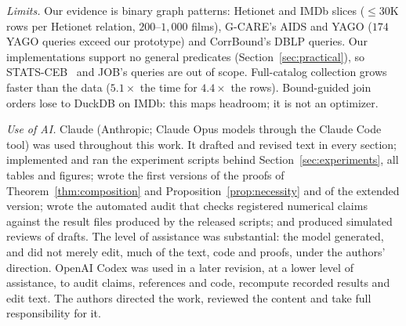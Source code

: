 \documentclass[sigconf, nonacm, acmthm=false]{acmart}
\begin{document}
\emph{Limits.} Our evidence is binary graph patterns: Hetionet and IMDb
slices (${\le}30$K rows per Hetionet relation, $200$--$1{,}000$ films), G-CARE's AIDS and YAGO
($174$ YAGO queries exceed our prototype) and
CorrBound's DBLP queries. Our implementations support no general predicates (Section~\ref{sec:practical}), so
STATS-CEB~\cite{han2021stats} and JOB's queries are out of scope.
Full-catalog collection grows faster than the data ($5.1\times$ the time for $4.4\times$ the rows). Bound-guided join orders lose to DuckDB on IMDb: this maps headroom; it is not an optimizer.

\begin{acks}
\emph{Use of AI.} Claude (Anthropic; Claude Opus models through the Claude
Code tool) was used throughout this work. It drafted and revised text in
every section; implemented and ran the experiment scripts behind
Section~\ref{sec:experiments}, all tables and figures; wrote the first
versions of the proofs of Theorem~\ref{thm:composition} and
Proposition~\ref{prop:necessity} and of the extended version; wrote the
automated audit that checks registered numerical claims against the result
files produced by the released scripts; and produced simulated reviews of
drafts. The level of assistance was substantial: the model generated, and
did not merely edit, much of the text, code and proofs, under the authors'
direction. OpenAI Codex was used in a later revision, at a lower level of
assistance, to audit claims, references and code, recompute recorded
results and edit text. The authors directed the work, reviewed the content
and take full responsibility for it.
\end{acks}

\clearpage


\end{document}
